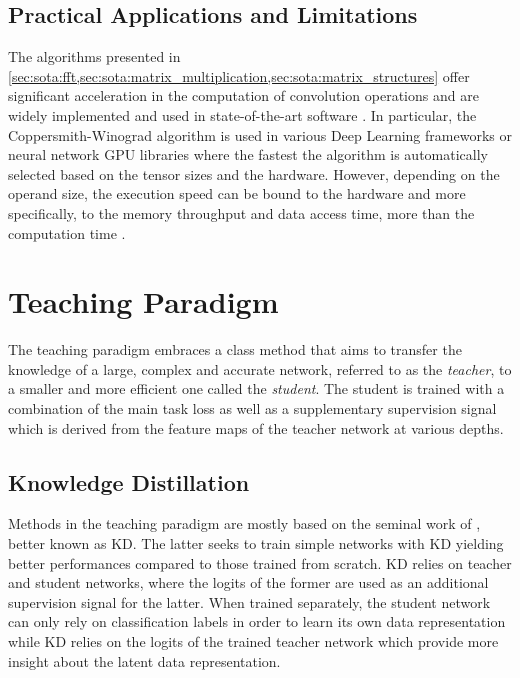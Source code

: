 \subsection{Practical Applications and Limitations}
The algorithms presented in
\cref{sec:sota:fft,sec:sota:matrix_multiplication,sec:sota:matrix_structures}
offer significant acceleration in the computation of convolution operations and
are widely implemented and used in state-of-the-art software
\cite{pytorch_vision,DBLP:journals/corr/AbadiABBCCCDDDG16}. In particular, the
Coppersmith-Winograd algorithm is used in various Deep Learning frameworks
\cite{DBLP:journals/corr/AbadiABBCCCDDDG16,DBLP:conf/nips/PaszkeGMLBCKLGA19} or
neural network \ac{GPU} libraries \cite{nvidia_cudnn} where the fastest the
algorithm is automatically selected based on the tensor sizes and the hardware.
However, depending on the operand size, the execution speed can be bound to the
hardware and more specifically, to the memory throughput and data access time,
more than the computation time
\cite{DBLP:journals/pc/WhaleyPD01,DBLP:journals/cca/DrevetIS10}.\\

\section{Teaching Paradigm}\label{sec:sota:teaching_paradigm}

The teaching paradigm embraces a class method that aims to transfer the
knowledge of a large, complex and accurate network, referred to as the
\emph{teacher}, to a smaller and more efficient one called the \emph{student}.
The student is trained with a combination of the main task loss as well as a
supplementary supervision signal which is derived from the feature maps of the
teacher network at various depths.\\


\subsection{Knowledge Distillation}
Methods in the teaching paradigm are mostly based on the seminal work of
\citeauthor{DBLP:journals/corr/HintonVD15} \cite{DBLP:journals/corr/HintonVD15},
better known as \acf{KD}. The latter seeks to train simple networks with \ac{KD}
yielding better performances compared to those trained from scratch. \ac{KD}
relies on teacher and student networks, where the logits of the former are used
as an additional supervision signal for the latter. When trained separately, the
student network can only rely on classification labels in order to learn its own
data representation while \ac{KD} relies on the logits of the trained teacher
network which provide more insight about the latent data representation.\\

